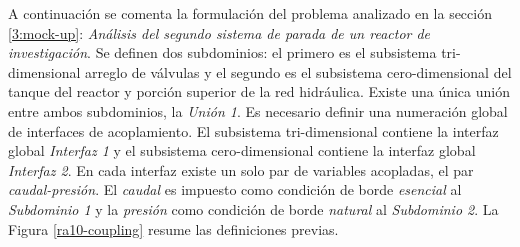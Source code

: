 A continuación se comenta la formulación del problema analizado en la sección \ref{3:mock-up}:
\textit{Análisis del segundo sistema de parada de un reactor de investigación}.
Se definen dos subdominios: el primero es el subsistema tri-dimensional arreglo de válvulas y el segundo es el subsistema cero-dimensional del tanque del reactor y porción superior de la red hidráulica.
Existe una única unión entre ambos subdominios, la \textit{Unión 1}.
Es necesario definir una numeración global de interfaces de acoplamiento.
El subsistema tri-dimensional contiene la interfaz global \textit{Interfaz 1} y el subsistema cero-dimensional contiene la interfaz global \textit{Interfaz 2}.
En cada interfaz existe un solo par de variables acopladas, el par \textit{caudal-presión}.
El \textit{caudal} es impuesto como condición de borde \textit{esencial} al \textit{Subdominio 1} y la \textit{presión} como condición de borde \textit{natural} al \textit{Subdominio 2}.
La Figura \ref{ra10-coupling} resume las definiciones previas.


